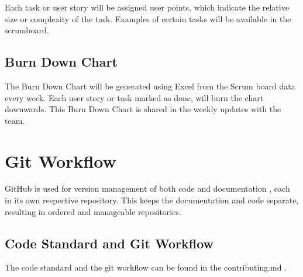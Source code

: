 \documentclass{projdoc}
\begin{document}
Each task or user story will be assigned user points, which indicate the relative size or complexity of the task. Examples of certain tasks will be available in the scrumboard.

\subsection{Burn Down Chart}

The Burn Down Chart will be generated using Excel from the Scrum board data every
week. Each user story or task marked as done, will burn the chart downwards. This
Burn Down Chart is shared in the weekly updates with the team.

\section{Git Workflow}

GitHub is used for version management of both code \autocite{crepe:code-repo} and
documentation \autocite{crepe:docs-repo}, each in its own respective repository. This
keeps the documentation and code separate, resulting in ordered and manageable
repositories.

\subsection{Code Standard and Git Workflow}

The code standard and the git workflow can be found in the contributing.md \autocite{crepe:code-standard}.
\end{document}
